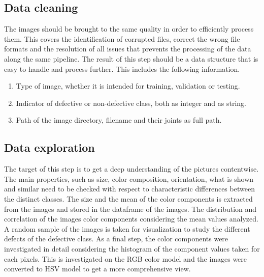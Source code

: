 \documentclass[10pt, final]{article}
\begin{document}
		\subsection{Data cleaning}
			The images should be brought to the same quality in order to efficiently process them.
			This covers the identification of corrupted files, correct the wrong file formats 
			and the resolution of all issues that prevents the processing of the data along the same pipeline.
			The result of this step should be a data structure that is easy to handle and process further.
			This includes the following information.
			\begin{enumerate}
				\item Type of image, whether it is intended for training, validation or testing.
				\item Indicator of defective or non-defective class, both as integer and as string.
				\item Path of the image directory, filename and their joints as full path.
			\end{enumerate}
		\subsection{Data exploration}
			The target of this step is to get a deep understanding of the pictures contentwise.
			The main properties, such as size, color composition, orientation, what is shown and similar need to be 
			checked with respect to characteristic differences between the distinct classes.
			The size and the mean of the color components is extracted from the images and stored in the dataframe 
			of the images.
			The distribution and correlation of the images color components considering the mean values analyzed.
			A random sample of the images is taken for visualization to study the different defects of the defective class.
			As a final step, the color components were investigated in detail considering the histogram of the component
			values taken for each pixels.
			This is investigated on the RGB color model and the images were converted to HSV model to get a more
			comprehensive view.
\end{document}
